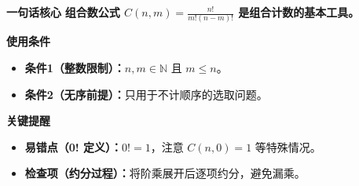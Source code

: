 \begin{summarybox}
	\textbf{\textcolor{CSummary}{一句话核心}}
	\textbf{组合数公式 $C(n,m)=\frac{n!}{m!(n-m)!}$ 是组合计数的基本工具。}

	\medskip
	\textbf{\textcolor{CSummary}{使用条件}}
	\begin{itemize}[leftmargin=*, itemsep=0.5em, topsep=0.4em]
		\item \textbf{条件1（整数限制）：}$n,m\in\mathbb{N}$ 且 $m\le n$。
		\item \textbf{条件2（无序前提）：}只用于不计顺序的选取问题。
	\end{itemize}

	\medskip
	\textbf{\textcolor{CSummary}{关键提醒}}
	\begin{itemize}[leftmargin=*, itemsep=0.5em, topsep=0.4em]
		\item \textbf{易错点（0! 定义）：}$0!=1$，注意 $C(n,0)=1$ 等特殊情况。
		\item \textbf{检查项（约分过程）：}将阶乘展开后逐项约分，避免漏乘。
	\end{itemize}

\end{summarybox}
